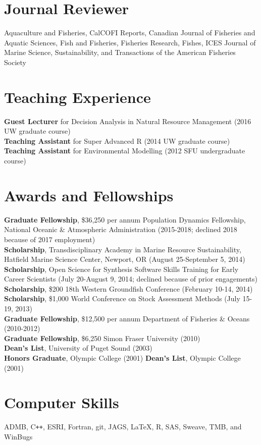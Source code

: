 \documentclass[10pt]{article}
\begin{document}
\section*{Journal Reviewer}
\noindent Aquaculture and Fisheries, CalCOFI Reports, Canadian Journal of Fisheries and Aquatic Sciences, Fish and Fisheries, Fisheries Research, Fishes, ICES Journal of Marine Science, Sustainability, and Transactions of the American Fisheries Society

\section*{Teaching Experience}
\textbf{Guest Lecturer} for Decision Analysis in Natural Resource Management (2016 UW graduate course)\\
\textbf{Teaching Assistant} for Super Advanced R (2014 UW graduate course)\\
\noindent
\textbf{Teaching Assistant} for Environmental Modelling (2012 SFU undergraduate course)

\section*{Awards and Fellowships}
\textbf{Graduate Fellowship}, \$36,250 per annum Population Dynamics Fellowship, National Oceanic \& Atmospheric Administration (2015-2018; declined 2018 because of 2017 employment)\\
\textbf{Scholarship}, Transdisciplinary Academy in Marine Resource Sustainability, Hatfield Marine Science Center, Newport, OR (August 25-September 5, 2014)\\
\textbf{Scholarship}, Open Science for Synthesis Software Skills Training for Early Career Scientists (July 20-August 9, 2014; declined because of prior engagements)\\
\textbf{Scholarship}, \$200 18th Western Groundfish Conference (February 10-14, 2014)\\
\textbf{Scholarship}, \$1,000 World Conference on Stock Assessment Methods (July 15-19, 2013)\\
\textbf{Graduate Fellowship}, \$12,500 per annum Department of Fisheries \& Oceans (2010-2012)\\
\textbf{Graduate Fellowship}, \$6,250 Simon Fraser University (2010)\\
\textbf{Dean's List}, University of Puget Sound (2003) \\
\textbf{Honors Graduate}, Olympic College (2001)
\textbf{Dean's List}, Olympic College (2001) \\

\section*{Computer Skills}
ADMB, C\texttt{++}, ESRI, Fortran, git, JAGS, \LaTeX, R, SAS, Sweave, TMB, and WinBugs
\end{document}

